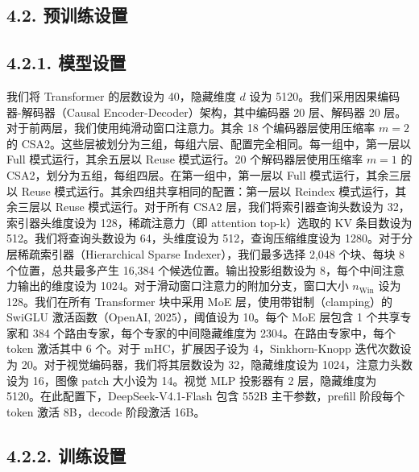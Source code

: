 \subsection{4.2. 预训练设置}\label{pre-training-setups}

\subsection{4.2.1. 模型设置}\label{model-setups}

我们将 Transformer 的层数设为 40，隐藏维度 $d$ 设为 5120。我们采用因果编码器-解码器（Causal Encoder-Decoder）架构，其中编码器 20 层、解码器 20 层。对于前两层，我们使用纯滑动窗口注意力。其余 18 个编码器层使用压缩率 \(m = 2\) 的 CSA2。这些层被划分为三组，每组六层、配置完全相同。每一组中，第一层以 Full 模式运行，其余五层以 Reuse 模式运行。20 个解码器层使用压缩率 \(m = 1\) 的 CSA2，划分为五组，每组四层。在第一组中，第一层以 Full 模式运行，其余三层以 Reuse 模式运行。其余四组共享相同的配置：第一层以 Reindex 模式运行，其余三层以 Reuse 模式运行。对于所有 CSA2 层，我们将索引器查询头数设为 32，索引器头维度设为 128，稀疏注意力（即 attention top-k）选取的 KV 条目数设为 512。我们将查询头数设为 64，头维度设为 512，查询压缩维度设为 1280。对于分层稀疏索引器（Hierarchical Sparse Indexer），我们最多选择 2,048 个块、每块 8 个位置，总共最多产生 16,384 个候选位置。输出投影组数设为 8，每个中间注意力输出的维度设为 1024。对于滑动窗口注意力的附加分支，窗口大小 \(n _ { \mathrm { W i n } }\) 设为 128。我们在所有 Transformer 块中采用 MoE 层，使用带钳制（clamping）的 SwiGLU 激活函数（OpenAI, 2025），阈值设为 10。每个 MoE 层包含 1 个共享专家和 384 个路由专家，每个专家的中间隐藏维度为 2304。在路由专家中，每个 token 激活其中 6 个。对于 mHC，扩展因子设为 4，Sinkhorn-Knopp 迭代次数设为 20。对于视觉编码器，我们将其层数设为 32，隐藏维度设为 1024，注意力头数设为 16，图像 patch 大小设为 14。视觉 MLP 投影器有 2 层，隐藏维度为 5120。在此配置下，DeepSeek-V4.1-Flash 包含 552B 主干参数，prefill 阶段每个 token 激活 8B，decode 阶段激活 16B。



\subsection{4.2.2. 训练设置}\label{training-setups}

